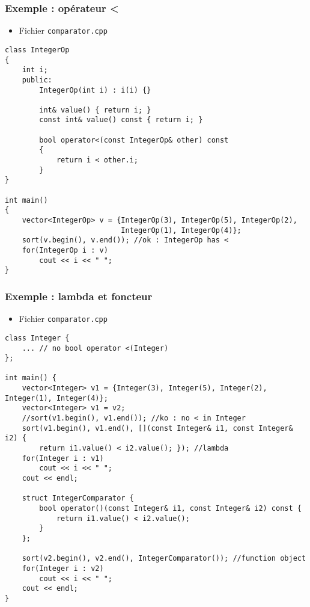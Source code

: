 \begin{frame}[containsverbatim]
\frametitle{Exemple : opérateur <}
\begin{itemize}
\item Fichier \texttt{comparator.cpp}
\end{itemize}
\begin{lstlisting}
class IntegerOp
{
    int i;
    public:
        IntegerOp(int i) : i(i) {}
    
        int& value() { return i; }
        const int& value() const { return i; }
    
        bool operator<(const IntegerOp& other) const
        {
            return i < other.i;
        }
}

int main()
{
    vector<IntegerOp> v = {IntegerOp(3), IntegerOp(5), IntegerOp(2), 
                           IntegerOp(1), IntegerOp(4)};
    sort(v.begin(), v.end()); //ok : IntegerOp has <
    for(IntegerOp i : v) 
        cout << i << " ";
}
\end{lstlisting}
\end{frame}

\begin{frame}[containsverbatim]
\frametitle{Exemple : lambda et foncteur}
\begin{itemize}
\item Fichier \texttt{comparator.cpp}
\end{itemize}
\begin{lstlisting}
class Integer {     
    ... // no bool operator <(Integer)
};

int main() {
	vector<Integer> v1 = {Integer(3), Integer(5), Integer(2), Integer(1), Integer(4)};
    vector<Integer> v1 = v2;
    //sort(v1.begin(), v1.end()); //ko : no < in Integer
    sort(v1.begin(), v1.end(), [](const Integer& i1, const Integer& i2) {
    	return i1.value() < i2.value(); }); //lambda
    for(Integer i : v1) 
        cout << i << " ";
    cout << endl;
    
    struct IntegerComparator {
        bool operator()(const Integer& i1, const Integer& i2) const {
            return i1.value() < i2.value();      
        }
    };
    
    sort(v2.begin(), v2.end(), IntegerComparator()); //function object
    for(Integer i : v2) 
        cout << i << " ";
    cout << endl;
}
\end{lstlisting}
\end{frame}

